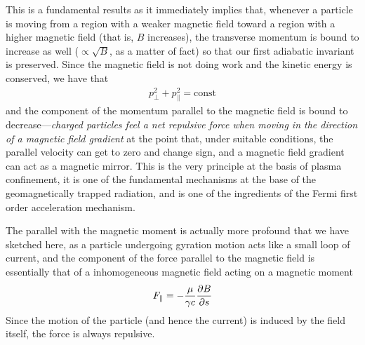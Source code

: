This is a fundamental results as it immediately implies that, whenever a particle
is moving from a region with a weaker magnetic field toward a region with a
higher magnetic field (that is, $B$ increases), the transverse momentum is bound
to increase as well ($\propto \sqrt{B}$, as a matter of fact) so that our first
adiabatic invariant is preserved. Since the magnetic field is not doing work and
the kinetic energy is conserved, we have that
\begin{align*}
  p_\perp^2 +  p_\parallel^2 = \text{const}
\end{align*}
and the component of the momentum parallel to the magnetic field is bound to
decrease---\emph{charged particles feel a net repulsive force when moving in
the direction of a magnetic field gradient} at the point that, under suitable
conditions, the parallel velocity can get to zero and change sign, and a magnetic
field gradient can act as a magnetic mirror. This is the very principle at the basis
of plasma confinement, it is one of the fundamental mechanisms at the base of the
geomagnetically trapped radiation, and is one of the ingredients of the Fermi
first order acceleration mechanism.

The parallel with the magnetic moment is actually more profound that we have
sketched here, as a particle undergoing gyration motion acts like a small loop
of current, and the component of the force parallel to the magnetic field is
essentially that of a inhomogeneous magnetic field acting on a magnetic moment
\begin{align}
  F_\parallel = -\frac{\mu}{\gamma c}\pdv{B}{s}
\end{align}
Since the motion of the particle (and hence the current) is induced by the field
itself, the force is always repulsive.

